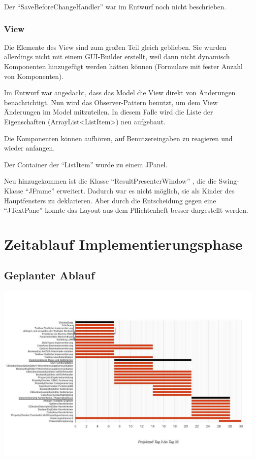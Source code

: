 \documentclass[a4paper]{scrreprt}
\begin{document}
Der "`SaveBeforeChangeHandler"' war im Entwurf noch nicht beschrieben.

\subsection{View}
Die Elemente des View sind zum großen Teil gleich geblieben. Sie wurden allerdings nicht mit einem GUI-Builder erstellt, weil dann nicht dynamisch Komponenten hinzugefügt werden hätten können (Formulare mit fester Anzahl von Komponenten).

Im Entwurf war angedacht, dass das Model die View direkt von Änderungen benachrichtigt. Nun wird das Observer-Pattern benutzt, um dem View Änderungen im Model mitzuteilen. In diesem Falle wird die Liste der Eigenschaften (ArrayList<ListItem>) neu aufgebaut.

Die Komponenten können aufhören, auf Benutzereingaben zu reagieren und wieder anfangen.

Der Container der "`ListItem"' wurde zu einem JPanel.

Neu hinzugekommen ist die Klasse "`ResultPresenterWindow"' , die die Swing-Klasse "`JFrame"' erweitert. Dadurch war es nicht möglich, sie als Kinder des Hauptfensters zu deklarieren. Aber durch die Entscheidung gegen eine "`JTextPane"' konnte das Layout aus dem Pflichtenheft besser dargestellt werden.




\chapter{Zeitablauf Implementierungsphase}

\section{Geplanter Ablauf}

\includegraphics[width=1.3\textwidth] {originalPlanung.jpg}
\end{document}
